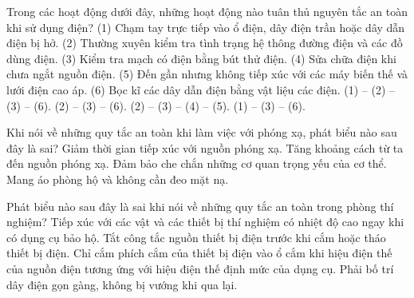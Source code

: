 \begin{ex}
Trong các hoạt động dưới đây, những hoạt động nào tuân thủ nguyên tắc an toàn khi sử dụng điện?
(1) Chạm tay trực tiếp vào ổ điện, dây điện trần hoặc dây dẫn điện bị hở.
(2) Thường xuyên kiểm tra tình trạng hệ thông đường điện và các đồ dùng điện.
(3) Kiểm tra mạch có điện bằng bút thử điện.
(4) Sửa chữa điện khi chưa ngắt nguồn điện.
(5) Đến gần nhưng không tiếp xúc với các máy biến thế và lưới điện cao áp.
(6) Bọc kĩ các dây dẫn điện bằng vật liệu các điện.
\choice
{(1) – (2) – (3) – (6).}
{\True (2) – (3) – (6).}
{(2) – (3) – (4) – (5).}
{(1) – (3) – (6).}
\end{ex}

\begin{ex}
Khi nói về những quy tắc an toàn khi làm việc với phóng xạ, phát biểu nào sau đây là sai?
\choice
{Giảm thời gian tiếp xúc với nguồn phóng xạ.}
{Tăng khoảng cách từ ta đến nguồn phóng xạ.}
{Đảm bảo che chắn những cơ quan trọng yếu của cơ thể.}
{\True Mang áo phòng hộ và không cần đeo mặt nạ.}
\end{ex}



\begin{ex}
Phát biểu nào sau đây là sai khi nói về những quy tắc an toàn trong phòng thí nghiệm?
\choice
{\True Tiếp xúc với các vật và các thiết bị thí nghiệm có nhiệt độ cao ngay khi có dụng cụ bảo hộ.}
{Tắt công tắc nguồn thiết bị điện trước khi cắm hoặc tháo thiết bị điện.}
{Chỉ cắm phích cắm của thiết bị điện vào ổ cắm khi hiệu điện thế của nguồn điện tương ứng với hiệu điện thế định mức của dụng cụ.}
{Phải bố trí dây điện gọn gàng, không bị vướng khi qua lại.}
\end{ex}

